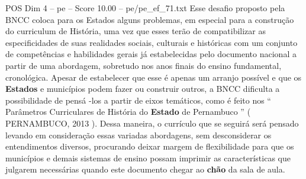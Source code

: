\begin{textsample}{POS Dim 4 – pe – Score 10.00 – pe/pe\_ef\_71.txt}
Esse desafio proposto pela BNCC coloca para os Estados alguns problemas, em especial para a construção do curriculum de História, uma vez que esses terão de compatibilizar as especificidades de suas realidades sociais, culturais e históricas com um conjunto de competências e habilidades gerais já estabelecidas pelo documento nacional a partir de uma abordagem, sobretudo nos anos finais do ensino fundamental, cronológica.
Apesar de estabelecer que esse é apenas um arranjo possível e que os \textbf{Estados} e municípios podem fazer ou construir outros, a BNCC dificulta a possibilidade de pensá -los a partir de eixos temáticos, como é feito nos “ Parâmetros Curriculares de História do \textbf{Estado} de Pernambuco ” ( PERNAMBUCO, 2013 ).
Dessa maneira, o currículo que se seguirá será pensado levando em consideração essas variadas abordagens, sem desconsiderar os entendimentos diversos, procurando deixar margem de flexibilidade para que os municípios e demais sistemas de ensino possam imprimir as características que julgarem necessárias quando este documento chegar ao \textbf{chão} da sala de aula.

\end{textsample}
